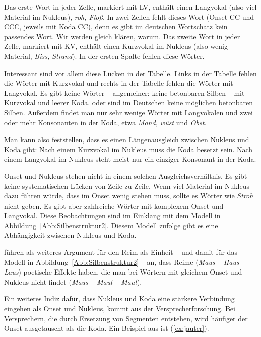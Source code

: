 Das erste Wort in jeder Zelle, markiert mit LV, enthält einen Langvokal (also viel Material im Nukleus), \zB \textit{roh, Floß}. In zwei Zellen fehlt dieses Wort (Onset CC und CCC, jeweils mit Koda CC), denn es gibt im deutschen Wortschatz kein passendes Wort. Wir werden gleich klären, warum. Das zweite Wort in jeder Zelle, markiert mit KV, enthält einen Kurzvokal im Nukleus (also wenig Material, \zB \textit{Biss, Strand}). In der ersten Spalte fehlen diese Wörter. 

Interessant sind vor allem diese Lücken in der Tabelle. Links in der Tabelle fehlen die Wörter mit Kurzvokal und rechts in der Tabelle fehlen die Wörter mit Langvokal. Es gibt keine Wörter -- allgemeiner: keine betonbaren Silben -- mit Kurzvokal und leerer Koda. \textipa{[KO]} oder \textipa{[StKO]} sind im Deutschen keine möglichen betonbaren Silben. Außerdem findet man nur sehr wenige Wörter mit Langvokalen und zwei oder mehr Konsonanten in der Koda, etwa \textit{Mond, wüst} und \textit{Obst}. 

Man kann also feststellen, dass es einen Längenausgleich zwischen Nukleus und Koda gibt: Nach einem Kurzvokal im Nukleus muss die Koda besetzt sein. Nach einem Langvokal im Nukleus steht meist nur ein einziger Konsonant in der  Koda. 

Onset und Nukleus stehen nicht in einem solchen Ausgleichsverhältnis. Es gibt keine systematischen Lücken von Zeile zu Zeile. Wenn viel Material im Nukleus dazu führen würde, dass im Onset wenig stehen muss, sollte es Wörter wie \textit{Stroh} nicht geben. Es gibt aber zahlreiche Wörter mit komplexem Onset und Langvokal. Diese Beobachtungen sind im Einklang mit dem Modell in Abbildung~\ref{Abb:Silbenstruktur2}. Diesem Modell zufolge gibt es eine Abhängigkeit zwischen Nukleus und Koda. 

\citet[135--136]{RamersVater1991} führen als weiteres Argument für den Reim als Einheit -- und damit für das Modell in Abbildung~\ref{Abb:Silbenstruktur2} -- an, dass Reime (\textit{Maus -- Haus -- Laus}) poetische Effekte haben, die man bei Wörtern mit gleichem Onset und Nukleus nicht findet (\textit{Maus -- Maul -- Maut}).

Ein weiteres Indiz dafür, dass Nukleus und Koda eine stärkere Verbindung eingehen als Onset und Nukleus, kommt aus der Versprecherforschung. Bei Versprechern, die durch Ersetzung von Segmenten entstehen, wird häufiger der Onset ausgetauscht als die Koda. Ein Beispiel aus \citet[321]{Schadeetal2008} ist (\ref{ex:jauter}). 
\ea
{}\label{ex:lauter}
\label{ex:jauter}
\z
\z

